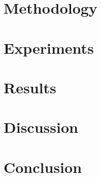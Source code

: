 \documentclass[master]{NTHUthesis}
\begin{document}


\chapter{Methodology}


\chapter{Experiments}


\chapter{Results}


\chapter{Discussion}


\chapter{Conclusion}


% 

% 


\end{document}
